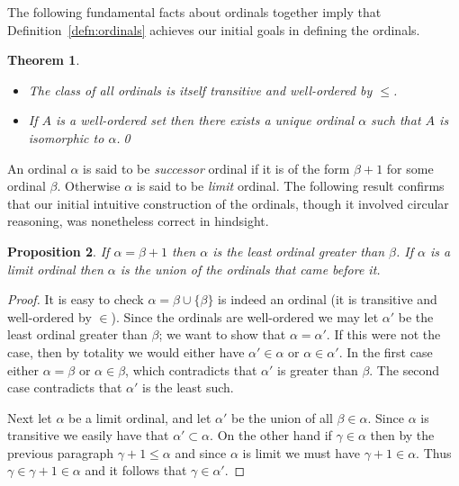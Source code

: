 \documentclass[11pt,oneside,a4paper]{amsbook}
\theoremstyle{definition}
\theoremstyle{plain}
\newtheorem{theorem}{Theorem}[section]
\newtheorem{proposition}[theorem]{Proposition}
\theoremstyle{definition}
\theoremstyle{remark}
\numberwithin{equation}{section}
\numberwithin{figure}{section}
\begin{document}
The following fundamental facts about ordinals together imply that Definition~\ref{defn:ordinals} achieves our initial goals in defining the ordinals.

\begin{theorem}\
  \label{thm:ordinals}
  \begin{itemize}
  \item The class of all ordinals is itself transitive and well-ordered by $\leq$.
  \item If $A$ is a well-ordered set then there exists a unique ordinal $\alpha$ such that $A$ is isomorphic to $\alpha$.\qed
  \end{itemize}
\end{theorem}

An ordinal $\alpha$ is said to be \emph{successor} ordinal if it is of the form $\beta+1$ for some ordinal $\beta$. Otherwise $\alpha$ is said to be \emph{limit} ordinal. The following result confirms that our initial intuitive construction of the ordinals, though it involved circular reasoning, was nonetheless correct in hindsight.

\begin{proposition}
  If $\alpha=\beta+1$ then $\alpha$ is the least ordinal greater than $\beta$. If $\alpha$ is a limit ordinal then $\alpha$ is the union of the ordinals that came before it.
\end{proposition}

\begin{proof}
  It is easy to check $\alpha=\beta\cup\{\beta\}$ is indeed an ordinal (it is transitive and well-ordered by $\in$). Since the ordinals are well-ordered we may let $\alpha'$ be the least ordinal greater than $\beta$; we want to show that $\alpha=\alpha'$. If this were not the case, then by totality we would either have $\alpha'\in\alpha$ or $\alpha\in\alpha'$. In the first case either $\alpha=\beta$ or $\alpha\in\beta$, which contradicts that $\alpha'$ is greater than $\beta$. The second case contradicts that $\alpha'$ is the least such.

  Next let $\alpha$ be a limit ordinal, and let $\alpha'$ be the union of all $\beta\in\alpha$. Since $\alpha$ is transitive we easily have that $\alpha'\subset\alpha$. On the other hand if $\gamma\in\alpha$ then by the previous paragraph $\gamma+1\leq\alpha$ and since $\alpha$ is limit we must have $\gamma+1\in\alpha$. Thus $\gamma\in\gamma+1\in\alpha$ and it follows that $\gamma\in\alpha'$.
\end{proof}
\end{document}
